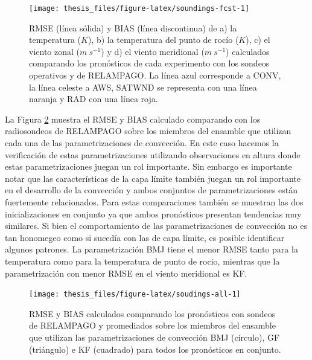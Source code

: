 \documentclass[12pt,oneside,a4paper]{reedthesis}
\begin{document}
\begin{figure}

{\centering \texttt{[image: thesis\_files/figure-latex/soundings-fcst-1]} 

}

\caption{RMSE (línea sólida) y BIAS (línea discontinua) de a) la temperatura (\(K\)), b) la temperatura del punto de rocío (\(K\)), c) el viento zonal (\(m\ s^{-1}\)) y d) el viento meridional (\(m\ s^{-1}\)) calculados comparando los pronósticos de cada experimento con los sondeos operativos y de RELAMPAGO. La línea azul corresponde a CONV, la línea celeste a AWS, SATWND se representa con una línea naranja y RAD con una línea roja.}\label{fig:soundings-fcst}
\end{figure}
La Figura \ref{fig:soudings-all} muestra el RMSE y BIAS calculado comparando con los radiosondeos de RELAMPAGO sobre los miembros del ensamble que utilizan cada una de las parametrizaciones de convección. En este caso hacemos la verificación de estas parametrizaciones utilizando observaciones en altura donde estas parametrizaciones juegan un rol importante. Sin embargo es importante notar que las características de la capa límite también juegan un rol importante en el desarrollo de la convección y ambos conjuntos de parametrizaciones están fuertemente relacionados. Para estas comparaciones también se muestran las dos inicializaciones en conjunto ya que ambos pronósticos presentan tendencias muy similares. Si bien el comportamiento de las parametrizaciones de convección no es tan honomegeo como si sucedía con las de capa límite, es posible identificar algunos patrones. La parametrización BMJ tiene el menor RMSE tanto para la temperatura como para la temperatura de punto de rocio, mientras que la parametrización con menor RMSE en el viento meridional es KF.


\begin{figure}

{\centering \texttt{[image: thesis\_files/figure-latex/soudings-all-1]} 

}

\caption{RMSE y BIAS calculados comparando los pronósticos con sondeos de RELAMPAGO y promediados sobre los miembros del ensamble que utilizan las parametrizaciones de convección BMJ (círculo), GF (triángulo) e KF (cuadrado) para todos los pronósticos en conjunto.}\label{fig:soudings-all}
\end{figure}
\end{document}
